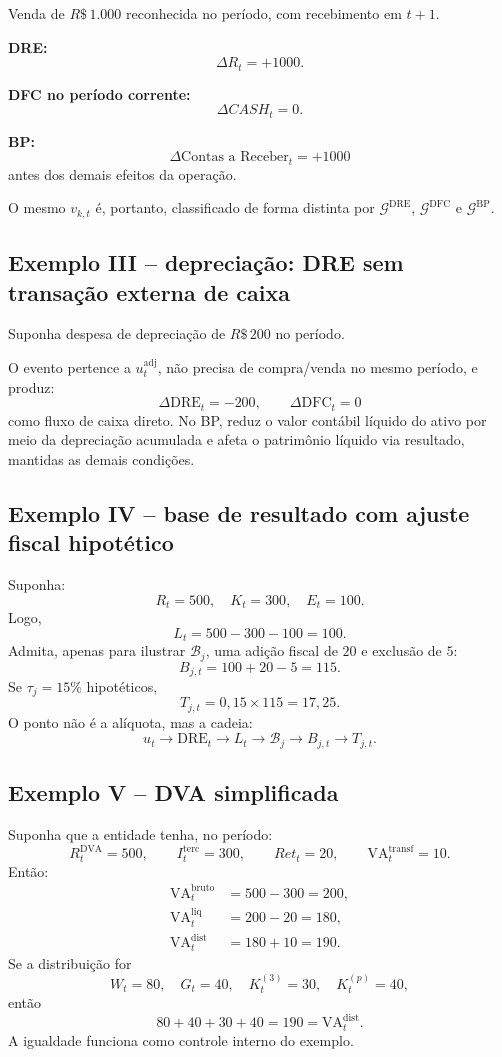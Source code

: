 \documentclass[11pt,a4paper]{article}
\newcommand{\BP}{\mathrm{BP}}
\newcommand{\DRE}{\mathrm{DRE}}
\newcommand{\DFC}{\mathrm{DFC}}
\newcommand{\DVA}{\mathrm{DVA}}
\newcommand{\VA}{\mathrm{VA}}
\newcommand{\cB}{\mathcal{B}}
\newcommand{\cG}{\mathcal{G}}
\begin{document}
Venda de $R\$\,1.000$ reconhecida no período, com recebimento em $t+1$.

\textbf{DRE:}
\[
\Delta R_t=+1000.
\]

\textbf{DFC no período corrente:}
\[
\Delta CASH_t=0.
\]

\textbf{BP:}
\[
\Delta \text{Contas a Receber}_t=+1000
\]
antes dos demais efeitos da operação.

O mesmo $v_{k,t}$ é, portanto, classificado de forma distinta por $\cG^{\DRE}$, $\cG^{\DFC}$ e $\cG^{\BP}$.

\subsection{Exemplo III -- depreciação: DRE sem transação externa de caixa}

Suponha despesa de depreciação de $R\$\,200$ no período.

O evento pertence a $u_t^{\mathrm{adj}}$, não precisa de compra/venda no mesmo período, e produz:
\[
\Delta \DRE_t=-200,
\qquad
\Delta \DFC_t=0
\]
como fluxo de caixa direto. No BP, reduz o valor contábil líquido do ativo por meio da depreciação acumulada e afeta o patrimônio líquido via resultado, mantidas as demais condições.

\subsection{Exemplo IV -- base de resultado com ajuste fiscal hipotético}

Suponha:
\[
R_t=500,
\quad K_t=300,
\quad E_t=100.
\]
Logo,
\[
L_t=500-300-100=100.
\]
Admita, apenas para ilustrar $\cB_j$, uma adição fiscal de $20$ e exclusão de $5$:
\[
B_{j,t}=100+20-5=115.
\]
Se $\tau_j=15\%$ hipotéticos,
\[
T_{j,t}=0{,}15\times115=17{,}25.
\]
O ponto não é a alíquota, mas a cadeia:
\[
u_t\to \DRE_t\to L_t\to \cB_j\to B_{j,t}\to T_{j,t}.
\]

\subsection{Exemplo V -- DVA simplificada}

Suponha que a entidade tenha, no período:
\[
R_t^{\DVA}=500,
\qquad
I_t^{\mathrm{terc}}=300,
\qquad
Ret_t=20,
\qquad
\VA_t^{\mathrm{transf}}=10.
\]
Então:
\begin{align*}
\VA_t^{\mathrm{bruto}}&=500-300=200,\\
\VA_t^{\mathrm{liq}}&=200-20=180,\\
\VA_t^{\mathrm{dist}}&=180+10=190.
\end{align*}
Se a distribuição for
\[
W_t=80,
\quad G_t=40,
\quad K_t^{(3)}=30,
\quad K_t^{(p)}=40,
\]
então
\[
80+40+30+40=190=\VA_t^{\mathrm{dist}}.
\]
A igualdade funciona como controle interno do exemplo.
\end{document}
